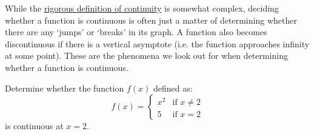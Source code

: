 While the \hyperref[def:continuity]{rigorous definition of continuity} is somewhat complex, deciding whether a function
is continuous is often just a matter of determining whether there are any `jumps' or `breaks' in its graph. A function also 
becomes discontinuous if there is a vertical asymptote (i.e. the function approaches infinity at some point). These 
are the phenomena we look out for when determining whether a function is continuous.

\begin{exercise}[Easy]
    Determine whether the function $f(x)$ defined as:
    \begin{equation}\label{eq:continuity-ex1}
        f(x) = 
        \begin{cases} 
            x^2 & \text{if } x \neq 2 \\
            5 & \text{if } x = 2 
        \end{cases}
    \end{equation}
    is continuous at $x=2$.
\end{exercise}
